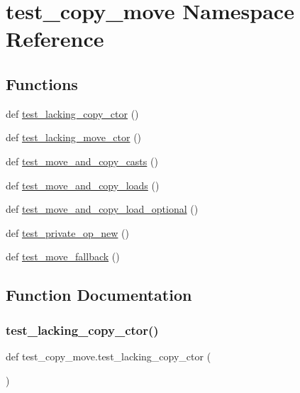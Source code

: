 \hypertarget{namespacetest__copy__move}{}\section{test\+\_\+copy\+\_\+move Namespace Reference}
\label{namespacetest__copy__move}
\subsection*{Functions}
\begin{DoxyCompactItemize}
\item 
def \mbox{\hyperlink{namespacetest__copy__move_a494a8d085640305a821e24845634cffe}{test\+\_\+lacking\+\_\+copy\+\_\+ctor}} ()
\item 
def \mbox{\hyperlink{namespacetest__copy__move_a059cbdc4f5c38167eddaffae86153d05}{test\+\_\+lacking\+\_\+move\+\_\+ctor}} ()
\item 
def \mbox{\hyperlink{namespacetest__copy__move_aee1dc18e1802561ebdab609df67cf4c6}{test\+\_\+move\+\_\+and\+\_\+copy\+\_\+casts}} ()
\item 
def \mbox{\hyperlink{namespacetest__copy__move_a584532c2bdc7663be264ed2199ac3854}{test\+\_\+move\+\_\+and\+\_\+copy\+\_\+loads}} ()
\item 
def \mbox{\hyperlink{namespacetest__copy__move_a518bfd196926abd26bf2bf38057fd3b5}{test\+\_\+move\+\_\+and\+\_\+copy\+\_\+load\+\_\+optional}} ()
\item 
def \mbox{\hyperlink{namespacetest__copy__move_aebeefa004272895b9e5a7afac5afa003}{test\+\_\+private\+\_\+op\+\_\+new}} ()
\item 
def \mbox{\hyperlink{namespacetest__copy__move_a6ab40e4b5cb58892953a09158f636b48}{test\+\_\+move\+\_\+fallback}} ()
\end{DoxyCompactItemize}


\subsection{Function Documentation}
\mbox{\label{namespacetest__copy__move_a494a8d085640305a821e24845634cffe}} 
\subsubsection{\texorpdfstring{test\_lacking\_copy\_ctor()}{test\_lacking\_copy\_ctor()}}
{\footnotesize\ttfamily def test\+\_\+copy\+\_\+move.\+test\+\_\+lacking\+\_\+copy\+\_\+ctor (\begin{DoxyParamCaption}{ }\end{DoxyParamCaption})}

